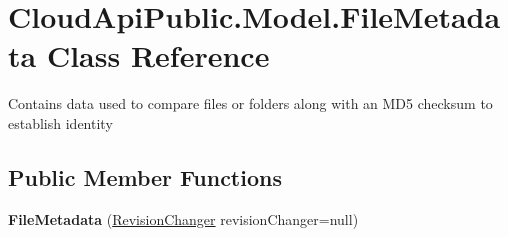 \hypertarget{class_cloud_api_public_1_1_model_1_1_file_metadata}{\section{Cloud\-Api\-Public.\-Model.\-File\-Metadata Class Reference}
\label{class_cloud_api_public_1_1_model_1_1_file_metadata}
}


Contains data used to compare files or folders along with an M\-D5 checksum to establish identity  


\subsection*{Public Member Functions}
\begin{DoxyCompactItemize}
\item 
\hypertarget{class_cloud_api_public_1_1_model_1_1_file_metadata_a6afa68e628b580db782c6d62bd8c5916}{{\bfseries File\-Metadata} (\hyperlink{class_cloud_api_public_1_1_model_1_1_revision_changer}{Revision\-Changer} revision\-Changer=null)}\label{class_cloud_api_public_1_1_model_1_1_file_metadata_a6afa68e628b580db782c6d62bd8c5916}

\end{DoxyCompactItemize}
